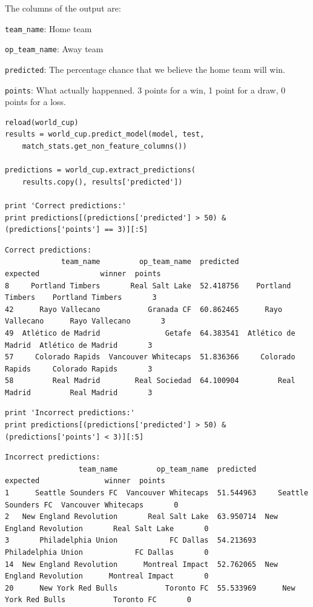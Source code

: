 \documentclass[12pt,fleqn]{article}\usepackage{../common}
\begin{document}
The columns of the output are:

\verb!team_name!: Home team

\verb!op_team_name!: Away team

\verb!predicted!: The percentage chance that we believe the home team will win.

\verb!points!: What actually happenned. 3 points for a win, 1 point for a draw, 0
points for a loss. 

\begin{verbatim}
reload(world_cup)
results = world_cup.predict_model(model, test, 
    match_stats.get_non_feature_columns())

predictions = world_cup.extract_predictions(
    results.copy(), results['predicted'])

print 'Correct predictions:'
print predictions[(predictions['predicted'] > 50) & (predictions['points'] == 3)][:5]
\end{verbatim}

\begin{verbatim}
Correct predictions:
             team_name         op_team_name  predicted            expected              winner  points
8     Portland Timbers       Real Salt Lake  52.418756    Portland Timbers    Portland Timbers       3
42      Rayo Vallecano           Granada CF  60.862465      Rayo Vallecano      Rayo Vallecano       3
49  Atlético de Madrid               Getafe  64.383541  Atlético de Madrid  Atlético de Madrid       3
57     Colorado Rapids  Vancouver Whitecaps  51.836366     Colorado Rapids     Colorado Rapids       3
58         Real Madrid        Real Sociedad  64.100904         Real Madrid         Real Madrid       3
\end{verbatim}

\begin{verbatim}
print 'Incorrect predictions:'
print predictions[(predictions['predicted'] > 50) & (predictions['points'] < 3)][:5]
\end{verbatim}

\begin{verbatim}
Incorrect predictions:
                 team_name         op_team_name  predicted                expected               winner  points
1      Seattle Sounders FC  Vancouver Whitecaps  51.544963     Seattle Sounders FC  Vancouver Whitecaps       0
2   New England Revolution       Real Salt Lake  63.950714  New England Revolution       Real Salt Lake       0
3       Philadelphia Union            FC Dallas  54.213693      Philadelphia Union            FC Dallas       0
14  New England Revolution      Montreal Impact  52.762065  New England Revolution      Montreal Impact       0
20      New York Red Bulls           Toronto FC  55.533969      New York Red Bulls           Toronto FC       0
\end{verbatim}
\end{document}
